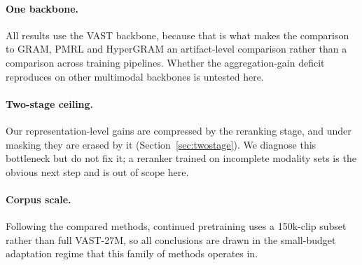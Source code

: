 \documentclass[10pt,twocolumn,letterpaper]{article}
\begin{document}
\paragraph{One backbone.}
All results use the VAST backbone, because that is what makes the comparison to
GRAM, PMRL and HyperGRAM an artifact-level comparison rather than a comparison
across training pipelines. Whether the aggregation-gain deficit reproduces on
other multimodal backbones is untested here.

\paragraph{Two-stage ceiling.}
Our representation-level gains are compressed by the reranking stage, and under
masking they are erased by it (Section~\ref{sec:twostage}). We diagnose this
bottleneck but do not fix it; a reranker trained on incomplete modality sets is
the obvious next step and is out of scope here.

\paragraph{Corpus scale.}
Following the compared methods, continued pretraining uses a 150k-clip subset
rather than full VAST-27M, so all conclusions are drawn in the small-budget
adaptation regime that this family of methods operates in.
\end{document}
